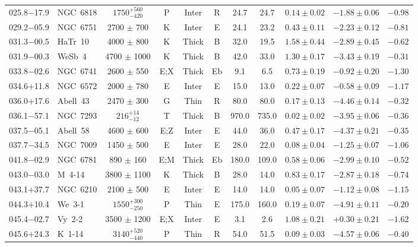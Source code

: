 \documentclass[useAMS]{mn2e}
\begin{document}
\begin{center}
{\begin{longtable}{llccccccccc}
025.8$-$17.9		&	NGC~6818	&	$1750^{+560}_{-420}$	&	P	&	Inter		&	R		&	24.7		&	24.7		&	$0.14 \pm 0.02$		&	$-1.88 \pm 0.06$		&	$-0.98$	\\
029.2$-$05.9		&	NGC~6751	&	2700	$\pm$	700	&	K		&	Inter		&	E		&	24.1		&	23.2		&	$0.43 \pm 0.11$		&	$-2.23 \pm 0.12$		&	$-0.81$	\\
031.3$-$00.5		&	HaTr~10	&	4000	$\pm$	800	&	K		&	Thick		&	B		&	32.0		&	19.5		&	$1.58 \pm 0.44$		&	$-2.89 \pm 0.45$		&	$-0.62$	\\
031.9$-$00.3		&	WeSb~4	&	4700	$\pm$	1000	&	K		&	Thick		&	B		&	42.0		&	33.0		&	$1.30 \pm 0.17$		&	$-3.43 \pm 0.19$		&	$-0.31$	\\
033.8$-$02.6		&	NGC~6741	&	2600	$\pm$	550	&	E;X		&	Thick	&	Eb		&	9.1		&	6.5		&	$0.73 \pm 0.19$		&	$-0.92 \pm 0.20$		&	$-1.30$	\\
034.6$+$11.8		&	NGC~6572	&	2000	$\pm$	780	&	E		&	Inter		&	E		&	15.0		&	13.0		&	$0.22 \pm 0.07$		&	$-0.58 \pm 0.09$		&	$-1.17$	\\
036.0$+$17.6		&	Abell~43	&	2470	$\pm$	300	&	G		&	Thin		&	R		&	80.0		&	80.0		&	$0.17 \pm 0.13$		&	$-4.46 \pm 0.14$		&	$-0.32$	\\
036.1$-$57.1		&	NGC~7293	&	$216^{+14}_{-12}$		&	T	&	Thick	&	B		&	970.0	&	735.0	&	$0.02 \pm 0.02$		&	$-3.95 \pm 0.06$		&	$-0.36$	\\
037.5$-$05.1		&	Abell~58	&	4600	$\pm$	600	&	E;Z		&	Inter		&	E		&	44.0		&	36.0		&	$0.47 \pm 0.17$		&	$-4.37 \pm 0.21$		&	$-0.35$	\\
037.7$-$34.5		&	NGC~7009	&	1450	$\pm$	500	&	E		&	Inter		&	E		&	28.0		&	22.0		&	$0.08 \pm 0.04$		&	$-1.25 \pm 0.07$		&	$-1.06$	\\
041.8$-$02.9		&	NGC~6781	&	890	$\pm$	160	&	E;M		&	Thick		&	Eb		&	180.0		&	109.0		&	$0.58 \pm 0.06$		&	$-2.99 \pm 0.10$		&	$-0.52$	\\
043.0$-$03.0		&	M~4-14	&	3800	$\pm$	1100	&	K		&	Thick		&	B		&	28.0		&	14.0		&	$0.83 \pm 0.17$		&	$-2.87 \pm 0.18$		&	$-0.74$	\\
043.1$+$37.7		&	NGC~6210	&	2100	$\pm$	500	&	E		&	Inter		&	E		&	14.0		&	14.0		&	$0.05 \pm 0.07$		&	$-1.12 \pm 0.08$		&	$-1.15$	\\
044.3$+$10.4		&	We~3-1	&	$1550^{+300}_{-250}$		&	P		&	Thin		&	E		&	175.0		&	160.0		&	$0.19 \pm 0.07$		&	$-4.91 \pm 0.11$		&	$-0.20$	\\
045.4$-$02.7		&	Vy~2-2	&	3500	$\pm$	1200	&	E;X		&	Inter		&	E		&	3.1		&	2.6		&	$1.08 \pm 0.21$		&	$+0.30 \pm 0.21$		&	$-1.62$	\\
045.6$+$24.3		&	K~1-14	&	$3140^{+520}_{-440}$		&	P		&	Thin		&	R		&	54.0		&	51.5		&	$0.09 \pm 0.03$		&	$-4.57 \pm 0.06$		&	$-0.40$	\\

\end{longtable}}
\end{center}
\end{document}
